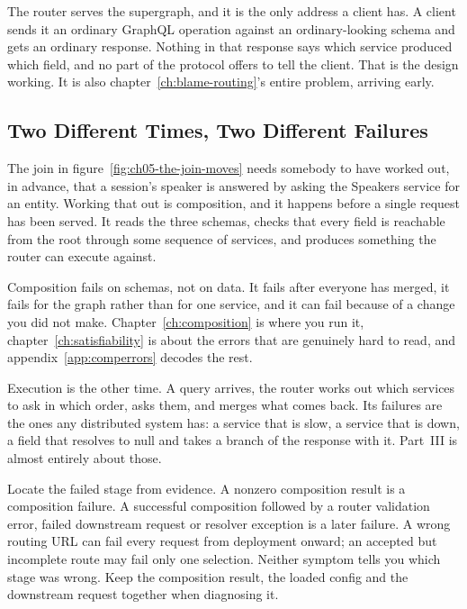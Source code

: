 %
The router serves the supergraph, and it is the only address a client has. A
client sends it an ordinary GraphQL operation against an ordinary-looking
schema and gets an ordinary response. Nothing in that response says which
service produced which field, and no part of the protocol offers to tell the
client. That is the design working. It is also
chapter~\ref{ch:blame-routing}'s entire problem, arriving early.

\subsection{Two Different Times, Two Different Failures}

%
The join in figure~\ref{fig:ch05-the-join-moves} needs somebody to have worked
out, in advance, that a session's speaker is answered by asking the Speakers
service for an entity. Working that out is composition, and it happens before a
single request has been served. It reads the three schemas, checks that every field is
reachable from the root through some sequence of services, and produces
something the router can execute against.

%
Composition fails on schemas, not on data. It fails after everyone has merged,
it fails for the graph rather than for one service, and it can fail because of
a change you did not make. Chapter~\ref{ch:composition} is where you run it,
chapter~\ref{ch:satisfiability} is about the errors that are genuinely hard to
read, and appendix~\ref{app:comperrors} decodes the rest.

%
Execution is the other time. A query arrives, the router works out which
services to ask in which order, asks them, and merges what comes back. Its
failures are the ones any distributed system has: a service that is slow, a
service that is down, a field that resolves to null and takes a branch of the
response with it. Part~III is almost entirely
about those.

%
Locate the failed stage from evidence. A nonzero composition result is a
composition failure. A successful composition followed by a router validation
error, failed downstream request or resolver exception is a later failure.
A wrong routing URL can fail every request from deployment onward; an accepted
but incomplete route may fail only one selection. Neither symptom tells you
which stage was wrong. Keep the composition result, the loaded config and the
downstream request together when diagnosing it.
%
